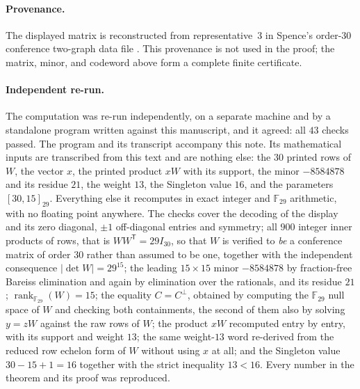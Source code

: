 \documentclass[11pt]{amsart}
\newcommand{\F}{\mathbb{F}}
\DeclareMathOperator{\rank}{rank}
\begin{document}
\paragraph{Provenance.}
The displayed matrix is reconstructed from representative~3 in
Spence's order-$30$ conference two-graph data file \cite{SpenceData}.
This provenance is not used in the proof; the matrix, minor, and
codeword above form a complete finite certificate.

\paragraph{Independent re-run.}
The computation was re-run independently, on a separate machine and by a
standalone program written against this manuscript, and it agreed: all
$43$ checks passed. The program and its transcript accompany this note.
Its mathematical inputs are
transcribed from this text and are nothing else:
the $30$ printed rows of $W$, the vector $x$, the printed product $xW$
with its support, the minor $-8584878$ and its residue $21$, the weight
$13$, the Singleton value $16$, and the parameters $[30,15]_{29}$.
Everything else it recomputes in exact integer and $\F_{29}$ arithmetic,
with no floating point anywhere. The checks cover the decoding of
the display and its zero diagonal, $\pm1$ off-diagonal entries and
symmetry; all $900$ integer inner products of rows, that is
$WW^{\mathsf T}=29I_{30}$, so that $W$ is verified to \emph{be} a
conference matrix of order $30$ rather than assumed to be one, together
with the independent consequence $\lvert\det W\rvert=29^{15}$; the
leading $15\times15$ minor $-8584878$ by fraction-free Bareiss
elimination and again by elimination over the rationals, and its residue
$21$; $\rank_{\F_{29}}(W)=15$; the equality $C=C^\perp$, obtained by
computing the $\F_{29}$ null space of $W$ and checking both containments,
the second of them also by solving $y=zW$ against the raw rows of $W$;
the product $xW$ recomputed entry by entry, with its support and weight
$13$; the same weight-$13$ word re-derived from the reduced row echelon
form of $W$ without using $x$ at all; and the Singleton value
$30-15+1=16$ together with the strict inequality $13<16$. Every number
in the theorem and its proof was reproduced.
\end{document}
